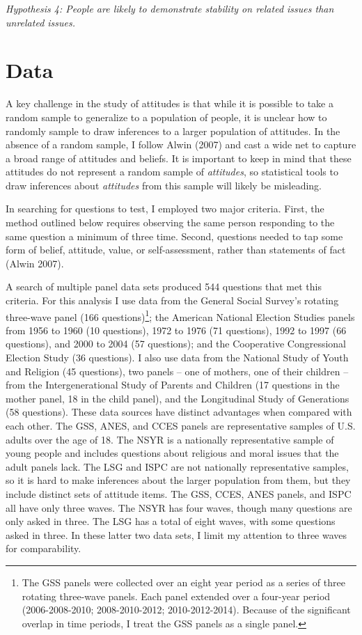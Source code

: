 \documentclass[12pt,]{article}
\begin{document}
\emph{Hypothesis 4: People are likely to demonstrate stability on related issues than unrelated issues.}

\hypertarget{data}{%
\section{Data}\label{data}}

A key challenge in the study of attitudes is that while it is possible to take a random sample to generalize to a population of people, it is unclear how to randomly sample to draw inferences to a larger population of attitudes. In the absence of a random sample, I follow Alwin (2007) and cast a wide net to capture a broad range of attitudes and beliefs. It is important to keep in mind that these attitudes do not represent a random sample of \emph{attitudes}, so statistical tools to draw inferences about \emph{attitudes} from this sample will likely be misleading.

In searching for questions to test, I employed two major criteria. First, the method outlined below requires observing the same person responding to the same question a minimum of three time. Second, questions needed to tap some form of belief, attitude, value, or self-assessment, rather than statements of fact (Alwin 2007).

A search of multiple panel data sets produced 544 questions that met this criteria. For this analysis I use data from the General Social Survey's rotating three-wave panel (166 questions)\footnote{The GSS panels were collected over an eight year period as a series of three rotating three-wave panels. Each panel extended over a four-year period (2006-2008-2010; 2008-2010-2012; 2010-2012-2014). Because of the significant overlap in time periods, I treat the GSS panels as a single panel.}; the American National Election Studies panels from 1956 to 1960 (10 questions), 1972 to 1976 (71 questions), 1992 to 1997 (66 questions), and 2000 to 2004 (57 questions); and the Cooperative Congressional Election Study (36 questions). I also use data from the National Study of Youth and Religion (45 questions), two panels -- one of mothers, one of their children -- from the Intergenerational Study of Parents and Children (17 questions in the mother panel, 18 in the child panel), and the Longitudinal Study of Generations (58 questions). These data sources have distinct advantages when compared with each other. The GSS, ANES, and CCES panels are representative samples of U.S. adults over the age of 18. The NSYR is a nationally representative sample of young people and includes questions about religious and moral issues that the adult panels lack. The LSG and ISPC are not nationally representative samples, so it is hard to make inferences about the larger population from them, but they include distinct sets of attitude items. The GSS, CCES, ANES panels, and ISPC all have only three waves. The NSYR has four waves, though many questions are only asked in three. The LSG has a total of eight waves, with some questions asked in three. In these latter two data sets, I limit my attention to three waves for comparability.
\end{document}
